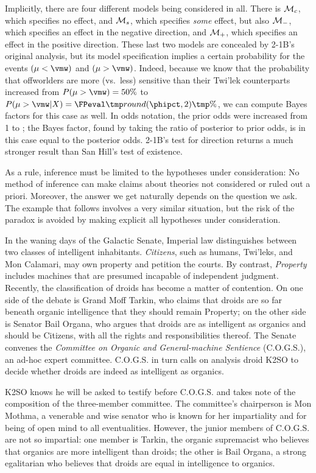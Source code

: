 Implicitly, there are four different models being considered in all. There is ${\cal M}_c$, which specifies no effect, and ${\cal M}_s$, which specifies \emph{some} effect, but also ${\cal M}_-$, which specifies an effect in the negative direction, and ${\cal M}_+$, which specifies an effect in the positive direction. These last two models are concealed by 2-1B's original analysis, but its model specification implies a certain probability for the events $(\mu < \vmw)$ and $(\mu > \vmw)$. Indeed, because we know that the probability that offworlders are more (vs.~less) sensitive than their Twi'lek counterparts increased from $P(\mu > \vmw) = 50\%$ to $P(\mu > \vmw|X) = \print[2]{\phipct}\%$, we can compute Bayes factors for this case as well. In odds notation, the prior odds were increased from 1 to \tmp;  the Bayes factor, found by taking the ratio of posterior to prior odds, is in this case equal to the posterior odds. 2-1B's test for direction returns a much stronger result than San Hill's test of existence.

As a rule, inference must be limited to the hypotheses under consideration: No method of inference can make claims about theories not considered or ruled out a priori. Moreover, the answer we get naturally depends on the question we ask. The example that follows involves a very similar situation, but the risk of the paradox is avoided by making explicit all hypotheses under consideration.

 \label{ex:droid}
In the waning days of the Galactic Senate, Imperial law distinguishes between two classes of intelligent inhabitants. \emph{Citizens}, such as humans, Twi'leks, and Mon Calamari, may own property and petition the courts. By contrast, \emph{Property} includes machines that are presumed incapable of independent judgment. Recently, the classification of droids has become a matter of contention. On one side of the debate is Grand Moff Tarkin, who claims that droids are so far beneath organic intelligence that they should remain Property; on the other side is Senator Bail Organa, who argues that droids are as intelligent as organics and should be Citizens, with all the rights and responsibilities thereof.\newcommand{\cogs}{{C.O.G.S.\xspace}} The Senate convenes the \emph{Committee on Organic and General-machine Sentience} (\cogs), an ad-hoc expert committee. \cogs{} in turn calls on analysis droid K2SO to decide whether droids are indeed as intelligent as organics.

K2SO knows he will be asked to testify before \cogs{} and takes note of the composition of the three-member committee. The committee's chairperson is Mon Mothma, a venerable and wise senator who is known for her impartiality and for being of open mind to all eventualities. However, the junior members of \cogs{} are not so impartial: one member is Tarkin, the organic supremacist who believes that organics are more intelligent than droids; the other is Bail Organa, a strong egalitarian who believes that droids are equal in intelligence to organics.

